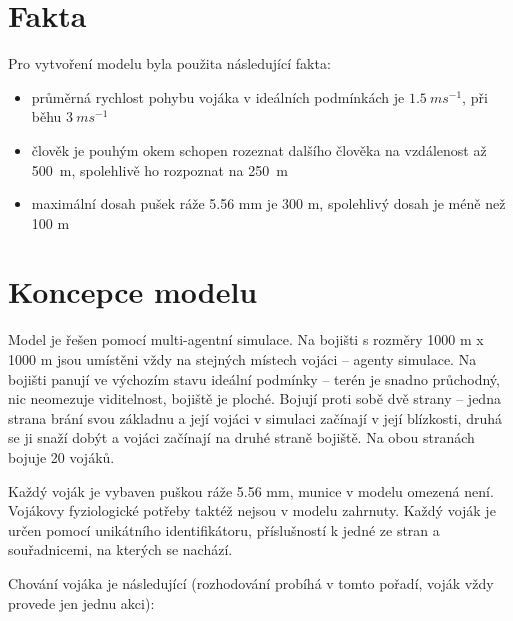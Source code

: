 \documentclass[a4paper, 11pt]{article}
\begin{document}
	\section{Fakta}
    Pro vytvoření modelu byla použita následující fakta:
    \begin{itemize}
        \item průměrná rychlost pohybu vojáka v ideálních podmínkách je $1.5\ ms^{-1}$, při běhu $3\ ms^{-1}$ \cite{speed}
        \item člověk je pouhým okem schopen rozeznat dalšího člověka na vzdálenost až 500~m, spolehlivě ho rozpoznat na 250~m \cite{vision}
        \item maximální dosah pušek ráže 5.56 mm je 300 m, spolehlivý dosah je méně než 100 m \cite{guns}
    \end{itemize}

	\section{Koncepce modelu}
    Model je řešen pomocí multi-agentní simulace. Na bojišti s rozměry 1000 m x 1000 m jsou umístěni vždy na stejných místech vojáci -- agenty simulace. Na bojišti panují ve výchozím stavu ideální podmínky -- terén je snadno průchodný, nic neomezuje viditelnost, bojiště je ploché. Bojují proti sobě dvě strany -- jedna strana brání svou základnu a její vojáci v simulaci začínají v její blízkosti, druhá se ji snaží dobýt a vojáci začínají na druhé straně bojiště. Na obou stranách bojuje 20 vojáků.

    Každý voják je vybaven puškou ráže 5.56 mm, munice v modelu omezená není. Vojákovy fyziologické potřeby taktéž nejsou v modelu zahrnuty. Každý voják je určen pomocí unikátního identifikátoru, příslušností k jedné ze stran a souřadnicemi, na kterých se nachází.

    Chování vojáka je následující (rozhodování probíhá v tomto pořadí, voják vždy provede jen jednu akci):
\end{document}
